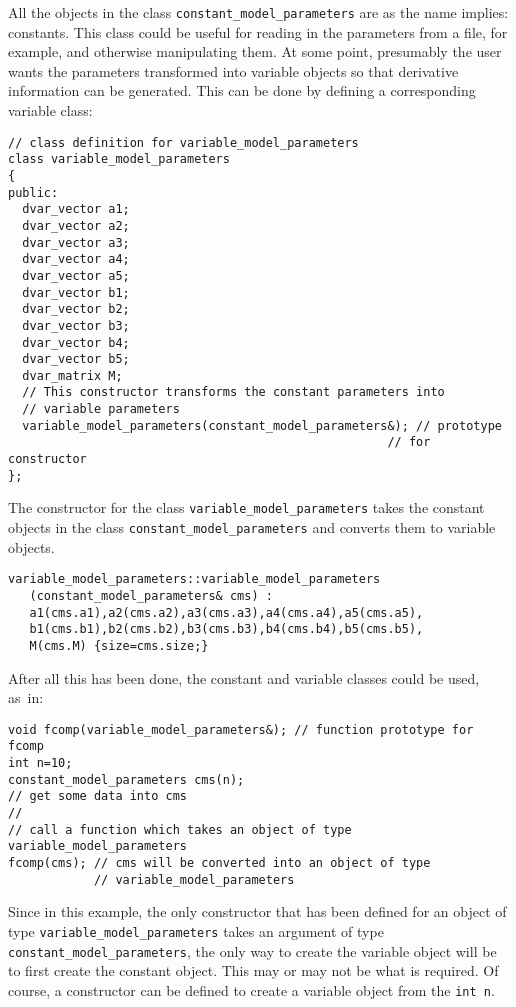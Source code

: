 \documentclass{admbmanual}
\begin{document}
All the objects in the class \texttt{constant\_model\_parameters} are as the
name implies: constants. This class could be useful for reading in the
parameters from a file, for example, and otherwise manipulating them. At some
point, presumably the user wants the parameters transformed into variable
objects so that derivative information can be generated. This can be done by
defining a corresponding variable class:

\begin{lstlisting}
// class definition for variable_model_parameters
class variable_model_parameters
{
public:
  dvar_vector a1;
  dvar_vector a2;
  dvar_vector a3;
  dvar_vector a4;
  dvar_vector a5;
  dvar_vector b1;
  dvar_vector b2;
  dvar_vector b3;
  dvar_vector b4;
  dvar_vector b5;
  dvar_matrix M;
  // This constructor transforms the constant parameters into
  // variable parameters
  variable_model_parameters(constant_model_parameters&); // prototype
                                                     // for constructor
};
\end{lstlisting}

The constructor for the class \texttt{variable\_model\_parameters} takes the
constant objects in the class \texttt{constant\_model\_parameters} and converts
them to variable objects.
\begin{lstlisting}
variable_model_parameters::variable_model_parameters
   (constant_model_parameters& cms) :
   a1(cms.a1),a2(cms.a2),a3(cms.a3),a4(cms.a4),a5(cms.a5),
   b1(cms.b1),b2(cms.b2),b3(cms.b3),b4(cms.b4),b5(cms.b5),
   M(cms.M) {size=cms.size;}
\end{lstlisting}

After all this has been done, the constant and variable classes could be used,
as~in:
\begin{lstlisting}
void fcomp(variable_model_parameters&); // function prototype for fcomp
int n=10;
constant_model_parameters cms(n);
// get some data into cms
//
// call a function which takes an object of type variable_model_parameters
fcomp(cms); // cms will be converted into an object of type
            // variable_model_parameters
\end{lstlisting}
Since in this example, the only constructor that has been defined for an object
of type \texttt{variable\_model\_parameters} takes an argument of type
\texttt{constant\_model\_parameters}, the only way to create the variable object
will be to first create the constant object. This may or may not be what is
required. Of course, a constructor can be defined to create a variable object
from the \texttt{int n}.
\end{document}
